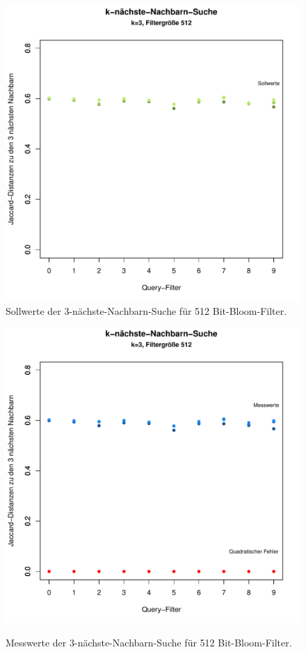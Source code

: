 \begin{figure}[hptb]
	\centering
	\includegraphics[scale=0.7]{pictures/nn3_512-1.pdf}\\
	\caption[Sollwerte der 3-nächste-Nachbarn-Suche für 512 Bit-Bloom-Filter]{Sollwerte der 3-nächste-Nachbarn-Suche für 512 Bit-Bloom-Filter.}\label{fig:pic12}
	\includegraphics[scale=0.7]{pictures/nn3_512-2.pdf}\\
	\caption[Messwerte der 3-nächste-Nachbarn-Suche für 512 Bit-Bloom-Filter]{Messwerte der 3-nächste-Nachbarn-Suche für 512 Bit-Bloom-Filter.}\label{fig:pic13}
\end{figure}
